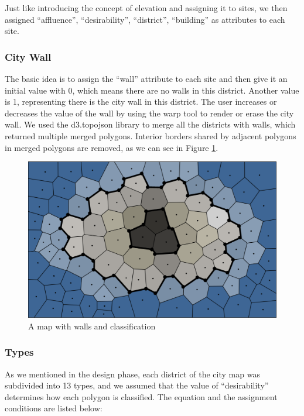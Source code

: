 Just like introducing the concept of elevation and assigning it to sites, we then assigned ``affluence'', ``desirability'', ``district'', ``building'' as attributes to each site.

\subsubsection{City Wall}
The basic idea is to assign the ``wall'' attribute to each site and then give it an initial value with 0, which means there are no walls in this district. Another value is 1, representing there is the city wall in this district. The user increases or decreases the value of the wall by using the warp tool to render or erase the city wall. We used the d3.topojson library to merge all the districts with walls, which returned multiple merged polygons. Interior borders shared by adjacent polygons in merged polygons are removed, as we can see in Figure \ref{fig:city wall and classification}.

\begin{figure}[htbp]
  \centering
  \includegraphics[width=\textwidth]{section04/assets/Map-wall.png}
  \caption{A map with walls and classification}
  \label{fig:city wall and classification}
\end{figure}

\subsubsection{Types}
As we mentioned in the design phase, each district of the city map was subdivided into 13 types, and we assumed that the value of ``desirability'' determines how each polygon is classified. The equation and the assignment conditions are listed below:

